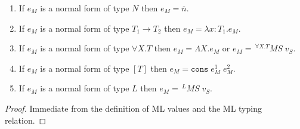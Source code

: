 \begin{mcf}
\label{mcf}
\mbox{}
\begin{enumerate}
\item If $e_{M}$ is a normal form of type $N$ then $e_{M}=\overline{n}$.
\item If $e_{M}$ is a normal form of type $T_{1}\rightarrow T_{2}$ then $e_{M}=\lambda x:T_{1}.e_{M}$.
\item If $e_{M}$ is a normal form of type $\forall X.T$ then $e_{M}=\Lambda X.e_{M}$ or $e_{M}=\,^{\forall X.T}MS\;v_{S}$.
\item If $e_{M}$ is a normal form of type $[T]$ then $e_{M}=\mathtt{cons}\;e_{M}^{1}\;e_{M}^{2}$.
\item If $e_{M}$ is a normal form of type $L$ then $e_{M}=\,^{L}MS\;v_{S}$.
\end{enumerate}
\begin{proof}
Immediate from the definition of ML values and the ML typing relation.
\end{proof}
\end{mcf}
